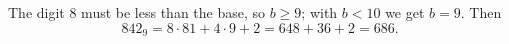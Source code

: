 The digit $8$ must be less than the base, so $b\ge9$; with $b<10$ we get $b=9$. Then
\[
842_9=8\cdot81+4\cdot9+2=648+36+2=\boxed{686}.
\]
